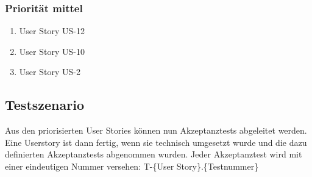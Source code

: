 \documentclass[listof=totocnumbered, bibliography=totocnumbered]{scrreprt}
\begin{document}
  \subsubsection{Priorität mittel}
  
  \begin{enumerate}
    \setcounter{enumi}{\value{userStoriesZaehler}}
    \item User Story US-12
    \item User Story US-10
    \item User Story US-2
  \end{enumerate}
  
  \subsection{Testszenario}
  
  Aus den priorisierten User Stories können nun Akzeptanztests abgeleitet
  werden. Eine Userstory ist dann fertig, wenn sie technisch umgesetzt wurde und
  die dazu definierten Akzeptanztests abgenommen wurden. Jeder Akzeptanztest
  wird mit einer eindeutigen Nummer versehen: T-\{User Story\}.\{Testnummer\}
    
\end{document}
